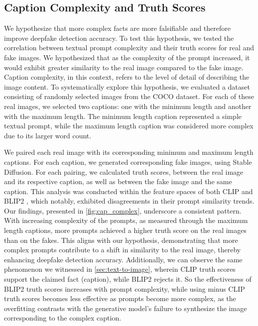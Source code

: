 \documentclass{article} \usepackage{iclr2024_conference,times}
\begin{document}
\subsection{Caption Complexity and Truth Scores}
\label{app:cap_complexity}
We hypothesize that more complex facts are more falsifiable and therefore improve deepfake detection accuracy. To test this hypothesis, we tested the correlation between textual prompt complexity and their truth scores for real and fake images. We hypothesized that as the complexity of the prompt increased, it would exhibit greater similarity to the real image compared to the fake image. Caption complexity, in this context, refers to the level of detail of describing the image content. To systematically explore this hypothesis, we evaluated a dataset consisting of  randomly selected images from the COCO \citep{coco} dataset. For each of these real images, we selected two captions: one with the minimum length and another with the maximum length. The minimum length caption represented a simple textual prompt, while the maximum length caption was considered more complex due to its larger word count. 

We paired each real image with its corresponding minimum and maximum length captions. For each caption, we generated corresponding fake images, using Stable Diffusion. For each pairing, we calculated truth scores, between the real image and its respective caption, as well as between the fake image and the same caption. This analysis was conducted within the feature spaces of both CLIP \citep{clip} and BLIP2 \citep{blip2}, which notably, exhibited disagreements in their prompt similarity trends. Our findings, presented in \cref{fig:cap_complex}, underscore a consistent pattern. With increasing complexity of the prompts, as measured through the maximum length captions, more prompts achieved a higher truth score on the real images than on the fakes. This aligns with our hypothesis, demonstrating that more complex prompts contribute to a shift in similarity to the real image, thereby enhancing deepfake detection accuracy. Additionally, we can observe the same phenomenon we witnessed in \cref{sec:text-to-image}, wherein CLIP truth scores support the claimed fact (caption), while BLIP2 rejects it. So the effectiveness of BLIP2 truth scores increases with prompt complexity, while using minus CLIP truth scores becomes less effective as prompts become more complex, as the overfitting contrasts with the generative model's failure to synthesize the image corresponding to the complex caption.
\end{document}
